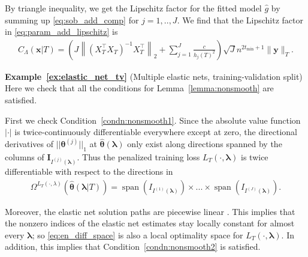 \documentclass[10pt]{book}
\theoremstyle{definition}
\DeclareMathOperator{\spann}{span}
\begin{document}
	By triangle inequality, we get the Lipschitz factor for the fitted model $\hat{g}$ by summing up \eqref{eq:sob_add_comp} for $j = 1,..,J$.
	We find that the Lipschitz factor in \eqref{eq:param_add_lipschitz} is
	\begin{align}
	C_\Lambda(\boldsymbol{x} | T)
	=
	\left(
	J
	\left \|
	\left(
	X_T^\top X_T
	\right)^{-1}
	X_T^\top
	\right \|_2
	+
	\sum_{j=1}^J \frac{c }{h_j(T)^2}
	\right)
	\sqrt{J}
	n^{2t_{\min} + 1}
	\|\boldsymbol{y}\|_T.
	\label{eq:sobolev_lipschitz}
	\end{align}

\noindent\textbf{Example~\ref{ex:elastic_net_tv}} (Multiple elastic nets, training-validation split)
	Here we check that all the conditions for Lemma~\ref{lemma:nonsmooth} are satisfied.

	First we check Condition~\ref{condn:nonsmooth1}.
	Since the absolute value function $|\cdot|$ is twice-continuously differentiable everywhere except at zero, the directional derivatives of $||\boldsymbol \theta^{(j)}||_1$ at $\hat{\boldsymbol{\theta}}(\boldsymbol{\lambda})$ only exist along directions spanned by the columns of $\boldsymbol I_{I^{(j)}(\boldsymbol \lambda)}$.
	Thus the penalized training loss $L_T(\cdot, \boldsymbol{\lambda})$ is twice differentiable with respect to the directions in
	\begin{align}
	\Omega^{L_T(\cdot, \lambda)}(\hat{\boldsymbol{\theta}}(\boldsymbol{\lambda} | T))
	= \spann(I_{I^{(1)}(\boldsymbol \lambda)}) \times ... \times \spann(I_{I^{(J)}(\boldsymbol \lambda)}).
	\label{eq:en_diff_space}
	\end{align}

	Moreover, the elastic net solution paths are piecewise linear \citep{zou2003regression}.
	This implies that the nonzero indices of the elastic net estimates stay locally constant for almost every $\boldsymbol{\lambda}$; so \eqref{eq:en_diff_space} is also a local optimality space for $L_T(\cdot, \boldsymbol{\lambda})$.
	In addition, this implies that Condition~\ref{condn:nonsmooth2} is satisfied.
\end{document}
